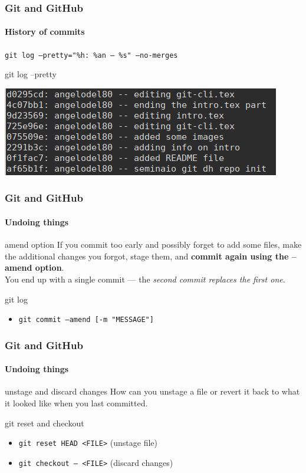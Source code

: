 \begin{frame}
	\frametitle{Git and GitHub}
    \framesubtitle{History of commits}
    \addtocounter{nframe}{1}

	\texttt{git log --pretty="\%h: \%an -- \%s" --no-merges}
	\begin{block}{git log --pretty}
		\begin{center}
			\includegraphics[width=.9\textwidth]{imgs/git-log-out.png}
		\end{center}
	\end{block}

\end{frame}

\begin{frame}
	\frametitle{Git and GitHub}
    \framesubtitle{Undoing things}
    \addtocounter{nframe}{1}

	\begin{block}{amend option}
		If you commit too early and possibly forget to add some files, make the additional changes you forgot, stage them, and \textbf{commit again using the --amend option}.
		\\ You end up with a single commit — the \textit{second commit replaces the first one}.
	\end{block}

	\begin{block}{git log}
		\begin{itemize}
			\item \texttt{git commit --amend [-m "MESSAGE"]}
		\end{itemize}
	\end{block}

\end{frame}

\begin{frame}
	\frametitle{Git and GitHub}
    \framesubtitle{Undoing things}
    \addtocounter{nframe}{1}

	\begin{block}{unstage and discard changes}
		How can you unstage a file or revert it back to what it looked like when you last committed.
	\end{block}

	\begin{block}{git reset and checkout}
		\begin{itemize}
			\item \texttt{git reset HEAD <FILE>} (unstage file)
			\item \texttt{git checkout -- <FILE>} (discard changes)
		\end{itemize}
	\end{block}

\end{frame}

